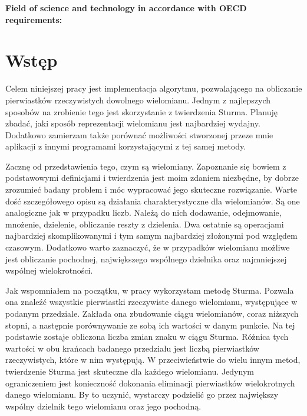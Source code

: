 \documentclass[oneside,a4paper]{book}
\begin{document}
	\vspace{12pt}
	\noindent\textbf{Field of science and technology in accordance with OECD requirements:}\\ 	
	
	\tableofcontents
	
	\mainmatter
	\setcounter{page}{7}
	
	\chapter{Wstęp}
	
	Celem niniejszej pracy jest implementacja algorytmu, pozwalającego na obliczanie pierwiastków rzeczywistych dowolnego wielomianu. Jednym z najlepszych sposobów na zrobienie tego jest skorzystanie z twierdzenia Sturma. Planuję zbadać, jaki sposób reprezentacji wielomianu jest najbardziej wydajny. Dodatkowo zamierzam także porównać możliwości stworzonej przeze mnie aplikacji z innymi programami korzystającymi z tej samej metody.
	
	Zacznę od przedstawienia tego, czym są wielomiany. Zapoznanie się bowiem z podstawowymi definicjami i twierdzenia jest moim zdaniem niezbędne, by dobrze zrozumieć badany problem i móc wypracować jego skuteczne rozwiązanie. Warte dość szczegółowego opisu są działania charakterystyczne dla wielomianów. Są one analogiczne jak w przypadku liczb. Należą do nich dodawanie, odejmowanie, mnożenie, dzielenie, obliczanie reszty z dzielenia. Dwa ostatnie są operacjami najbardziej skomplikowanymi i tym samym najbardziej złożonymi pod względem czasowym. Dodatkowo warto zaznaczyć, że w przypadków wielomianu możliwe jest obliczanie pochodnej, największego wspólnego dzielnika oraz najmniejszej wspólnej wielokrotności.
	
	Jak wspomniałem na początku, w pracy wykorzystam metodę Sturma. Pozwala ona znaleźć wszystkie pierwiastki rzeczywiste danego wielomianu, występujące w podanym przedziale. Zakłada ona zbudowanie ciągu wielomianów, coraz niższych stopni, a następnie porównywanie ze sobą ich wartości w danym punkcie. Na tej podstawie zostaje obliczona liczba zmian znaku w ciągu Sturma. Różnica tych wartości w obu krańcach badanego przedziału jest liczbą pierwiastków rzeczywistych, które w nim występują. W przeciwieństwie do wielu innym metod, twierdzenie Sturma jest skuteczne dla każdego wielomianu. Jedynym ograniczeniem jest konieczność dokonania eliminacji pierwiastków wielokrotnych danego wielomianu. By to uczynić, wystarczy podzielić go przez największy wspólny dzielnik tego wielomianu oraz jego pochodną.
	
\end{document}
